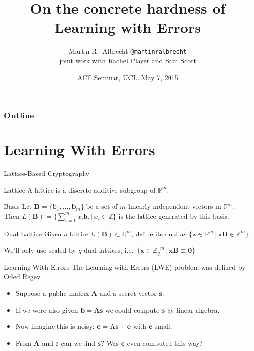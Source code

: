 \documentclass[10pt,compress]{beamer}
\title[On the concrete hardness of Learning with Errors]{On the concrete hardness of Learning with Errors}
\author[Martin R.\ Albrecht]{Martin R.\ Albrecht \texttt{@martinralbrecht}\\
 joint work with Rachel Player and Sam Scott}
\institute{Information Security Group Royal Holloway, University of London}
\date{ACE Seminar, UCL. May 7, 2015}
\renewcommand{\vec}[1]{\mathbf{#1}\xspace}
\newcommand{\Zq}{\ensuremath{\Z_q}\xspace}
\renewcommand{\vec}[1]{\mathbf{#1}\xspace}
\newcommand{\Z}{\ensuremath{\mathbb{Z}}\xspace}
\begin{document}
\begin{frame}
  \maketitle
\end{frame}

\setcounter{tocdepth}{1}
\begin{frame}
  \frametitle{Outline}
  \tableofcontents
\end{frame}


\section{Learning With Errors}


\begin{frame}{Lattice-Based Cryptography}
  \begin{alertblock}{Lattice}
    A lattice is a discrete additive subgroup of $\mathbb{R}^m$.
  \end{alertblock} 
  \begin{alertblock}{Basis}
    Let $\vec{B} = \{ \vec{b}_1, ..., \vec{b}_m \}$ be a set of $m$ linearly independent vectors in $\mathbb{R}^m$. Then $L(\vec{B})=\{ \sum_{i=1}^{m} x_i \vec{b}_i \,|\, x_i \in \mathbb{Z}\}$ is the lattice generated by this basis.
  \end{alertblock} 
  \begin{alertblock}{Dual Lattice}
    Given a lattice $L(\vec{B}) \subset \mathbb{R}^m$, define its dual as $\{ \vec{x} \in \mathbb{R}^m \, | \, \vec{x} \vec{B} \in \mathbb{Z}^m  \}$. \\
  \end{alertblock}

  We’ll only use scaled-by-$q$ dual lattices, i.e.\  $\{ \vec{x} \in \Zq^m \, | \, \vec{x} \vec{B} \equiv \vec{0}  \}$
\end{frame}


\begin{frame}{Learning With Errors}
  The Learning with Errors (LWE) problem was defined by Oded Regev~\cite{STOC:Regev05}. 

  \begin{itemize}
  \item Suppose a public matrix $\vec{A}$ and a secret vector $\vec{s}$.
  \item If we were also given $\vec{b}=\vec{A}\vec{s}$ we could compute $\vec{s}$ by linear algebra.
  \item Now imagine this is noisy: $\vec{c}=\vec{A}\vec{s}+\vec{e}$ with $\vec{e}$ small.
  \item From $\vec{A}$ and  $\vec{c}$ can we find $\vec{s}$? Was $\vec{c}$ even computed this way?
  \end{itemize}
\end{frame}
\end{document}
